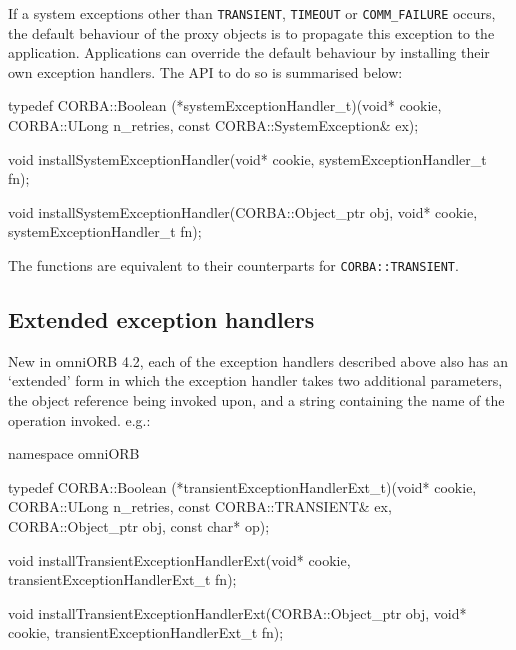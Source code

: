 \documentclass[11pt,oneside,a4paper]{book}
\newcommand{\code}[1]{\texttt{#1}}
\begin{document}
If a system exceptions other than \code{TRANSIENT}, \code{TIMEOUT} or
\code{COMM\_FAILURE} occurs, the default behaviour of the proxy
objects is to propagate this exception to the application.
Applications can override the default behaviour by installing their
own exception handlers. The API to do so is summarised below:


\begin{cxxlisting}
typedef CORBA::Boolean
(*systemExceptionHandler_t)(void* cookie,
                            CORBA::ULong n_retries,
                            const CORBA::SystemException& ex);

void
installSystemExceptionHandler(void* cookie,
                              systemExceptionHandler_t fn);

void
installSystemExceptionHandler(CORBA::Object_ptr obj,
                              void* cookie,
                              systemExceptionHandler_t fn);
\end{cxxlisting}

The functions are equivalent to their counterparts for
\code{CORBA::TRANSIENT}.



\subsection{Extended exception handlers}

New in omniORB 4.2, each of the exception handlers described above
also has an `extended' form in which the exception handler takes two
additional parameters, the object reference being invoked upon, and a
string containing the name of the operation invoked. e.g.:

\begin{cxxlisting}
namespace omniORB {
  
  typedef CORBA::Boolean 
  (*transientExceptionHandlerExt_t)(void*                   cookie,
                                    CORBA::ULong            n_retries,
                                    const CORBA::TRANSIENT& ex,
                                    CORBA::Object_ptr       obj,
                                    const char*             op);

  void 
  installTransientExceptionHandlerExt(void* cookie,
                                     transientExceptionHandlerExt_t fn);

  void
  installTransientExceptionHandlerExt(CORBA::Object_ptr obj,
                                      void* cookie,
                                      transientExceptionHandlerExt_t fn);
}
\end{cxxlisting}
\end{document}
